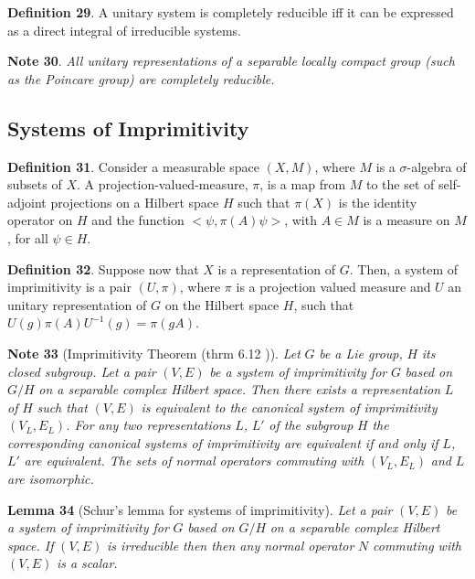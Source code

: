 \documentclass[11pt]{book}
\begin{document}
\textbf{Definition 29}. A unitary system is completely reducible iff it
can be expressed as a direct integral of irreducible systems.

\textbf{Note 30}. \emph{All unitary representations of a separable
locally compact group (such as the Poincare group) are completely
reducible.}

\hypertarget{section:Imprimitivity}{%
\subsection{Systems of Imprimitivity}\label{section:Imprimitivity}}

\textbf{Definition 31}. Consider a measurable space \((X, M)\), where
\(M\) is a \(\sigma\)-algebra of subsets of \(X\). A
projection-valued-measure, \(\pi\), is a map from \(M\) to the set of
self-adjoint projections on a Hilbert space \(H\) such that \(\pi(X)\)
is the identity operator on \(H\) and the function
\(<\psi,\pi(A)\psi>\), with \(A\in M\) is a measure on \(M\), for all
\(\psi\in H\).

\textbf{Definition 32}. Suppose now that \(X\) is a representation of
\(G\). Then, a system of imprimitivity is a pair \((U,\pi)\), where
\(\pi\) is a projection valued measure and \(U\) an unitary
representation of \(G\) on the Hilbert space \(H\), such that
\(U(g)\pi(A) U^{-1}(g)=\pi(gA)\).

\textbf{Note 33} (Imprimitivity Theorem (thrm 6.12
\cite{Doebner2001Quantization}\cite{Kaniuth2013Induced}\cite{Mackey1989Unitary}\cite{Cassinelli2000Square}\cite{Varadarajan2007Geometry})). \emph{Let }\(G\)\emph{ be a Lie group, }\(H\)\emph{ its closed
subgroup. Let a pair }\((V, E)\)\emph{ be a system of imprimitivity for
}\(G\)\emph{ based on }\(G/H\)\emph{ on a separable complex Hilbert
space. Then there exists a representation }\(L\)\emph{ of }\(H\)\emph{
such that }\((V, E)\)\emph{ is equivalent to the canonical system of
imprimitivity }\((V_L,E_L)\)\emph{. For any two representations
}\(L\)\emph{, }\(L'\)\emph{ of the subgroup }\(H\)\emph{ the
corresponding canonical systems of imprimitivity are equivalent if and
only if }\(L\)\emph{, }\(L'\)\emph{ are equivalent. The sets of normal
operators commuting with }\((V_L, E_L )\)\emph{ and }\(L\)\emph{ are
isomorphic.}

\textbf{Lemma 34} (Schur's lemma for systems of
imprimitivity\cite{Ramakrishnan1999Fourier}). \emph{Let a pair }\((V, E)\)\emph{ be a system of
imprimitivity for }\(G\)\emph{ based on }\(G/H\)\emph{ on a separable
complex Hilbert space. If }\((V, E)\)\emph{ is irreducible then then any
normal operator }\(N\)\emph{ commuting with }\((V,E)\)\emph{ is a
scalar.}
\end{document}
